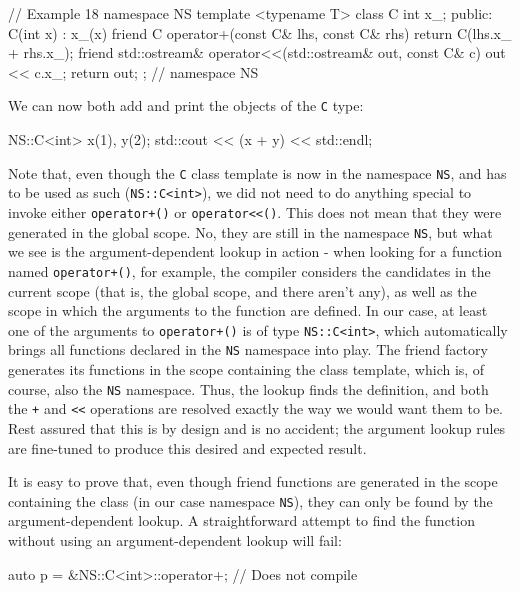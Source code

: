 \begin{code}
// Example 18
namespace NS {
template <typename T> class C {
  int x_;
  public:
  C(int x) : x_(x) {}
  friend C operator+(const C& lhs, const C& rhs) {
    return C(lhs.x_ + rhs.x_);
  }
  friend std::ostream&
  operator<<(std::ostream& out, const C& c) {
    out << c.x_;
    return out;
  }
};
} // namespace NS
\end{code}

We can now both add and print the objects of the \texttt{C} type:

\begin{code}
NS::C<int> x(1), y(2);
std::cout << (x + y) << std::endl;
\end{code}

Note that, even though the \texttt{C} class template is now in the namespace \texttt{NS}, and has to be used as such (\texttt{NS::C\textless{}int\textgreater{}}), we did not need to do anything special to invoke either \texttt{operator+()} or \texttt{operator\textless{}\textless{}()}. This does not mean that they were generated in the global scope. No, they are still in the namespace \texttt{NS}, but what we see is the argument-dependent lookup in action - when looking for a function named \texttt{operator+()}, for example, the compiler considers the candidates in the current scope (that is, the global scope, and there aren't any), as well as the scope in which the arguments to the function are defined. In our case, at least one of the arguments to \texttt{operator+()} is of type \texttt{NS::C\textless{}int\textgreater{}}, which automatically brings all functions declared in the \texttt{NS} namespace into play. The friend factory generates its functions in the scope containing the class template, which is, of course, also the \texttt{NS} namespace. Thus, the lookup finds the definition, and both the \texttt{+} and \texttt{\textless{}\textless{}} operations are resolved exactly the way we would want them to be. Rest assured that this is by design and is no accident; the argument lookup rules are fine-tuned to produce this desired and expected result.

It is easy to prove that, even though friend functions are generated in the scope containing the class (in our case namespace \texttt{NS}), they can only be found by the argument-dependent lookup. A straightforward attempt to find the function without using an argument-dependent lookup will fail:

\begin{code}
auto p = &NS::C<int>::operator+; // Does not compile
\end{code}

